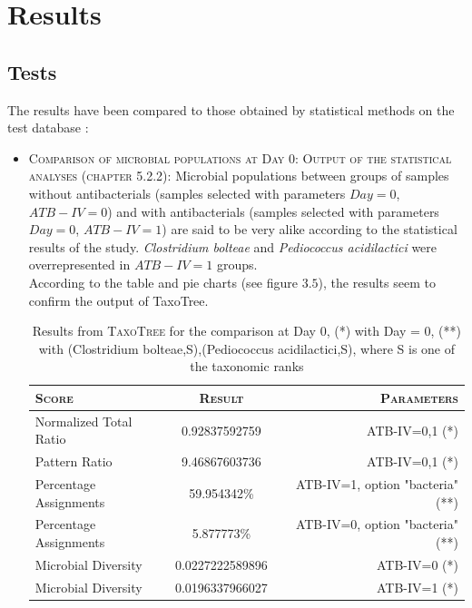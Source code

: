 \documentclass{report}
\begin{document}
\section{Results}

\subsection{Tests}

The results have been compared to those obtained by statistical methods on the test database \cite{Enaud}:

\begin{itemize}
\item \textsc{Comparison of microbial populations at Day 0:} 
       \textsc{Output of the statistical analyses (chapter 5.2.2):} Microbial populations between groups of samples without antibacterials (samples selected with parameters $Day = 0$, $ATB-IV = 0$) and with antibacterials (samples selected with parameters $Day = 0$, $ATB-IV = 1$) are said to be very alike according to the statistical results of the study. \emph{Clostridium bolteae} and \emph{Pediococcus acidilactici} were overrepresented in $ATB-IV = 1$ groups.\\

According to the table and pie charts (see figure $3.5$), the results seem to confirm the output of TaxoTree.

     \begin{table}[H]
       \caption{Results from \textsc{TaxoTree} for the comparison at Day 0, (*) with Day = 0, (**) with (Clostridium bolteae,S),(Pediococcus acidilactici,S), where S is one of the taxonomic ranks}
       \begin{tabular}{|l|c|r|}
         \hline
         \textsc{Score} & \textsc{Result} & \textsc{Parameters}\\
         \hline
         Normalized Total Ratio & 0.92837592759 & ATB-IV=0,1 (*)\\
         \hline
         Pattern Ratio & 9.46867603736 & ATB-IV=0,1 (*)\\
         \hline
         Percentage Assignments & 59.954342\% & ATB-IV=1, option "bacteria" (**)\\
         \hline
         Percentage Assignments & 5.877773\% & ATB-IV=0, option "bacteria" (**)\\
         \hline
         Microbial Diversity & 0.0227222589896 & ATB-IV=0 (*) \\
         \hline
         Microbial Diversity & 0.0196337966027 & ATB-IV=1 (*) \\
         \hline
       \end{tabular}
     \end{table}


\end{itemize}
\end{document}
